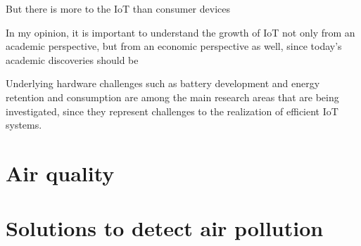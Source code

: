 		But there is more to the IoT than consumer devices
		
		In my opinion, it is important to understand the growth of IoT not only from an academic perspective, but from an economic perspective as well, since today's academic discoveries should be 
			
		Underlying hardware challenges such as battery development and energy retention and consumption are among the main research areas that are being investigated, since they represent challenges to the realization of efficient IoT systems.
		
		

\newpage
\section{Air quality}








%


	\section{Solutions to detect air pollution}

